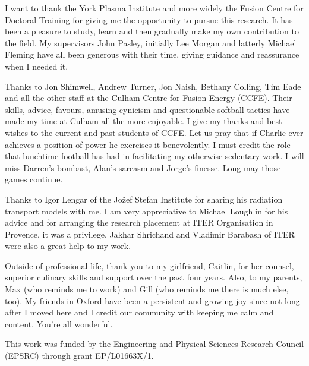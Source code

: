 
\begin{acknowledgements}      
I want to thank the York Plasma Institute and more widely the Fusion Centre for Doctoral Training for giving me the opportunity to pursue this research. It has been a pleasure to study, learn and then gradually make my own contribution to the field. My supervisors John Pasley, initially Lee Morgan and latterly Michael Fleming have all been generous with their time, giving guidance and reassurance when I needed it. 

Thanks to Jon Shimwell, Andrew Turner, Jon Naish, Bethany Colling, Tim Eade and all the other staff at the Culham Centre for Fusion Energy (CCFE). Their skills, advice, favours, amusing cynicism and questionable softball tactics have made my time at Culham all the more enjoyable. I give my thanks and best wishes to the current and past students of CCFE. Let us pray that if Charlie ever achieves a position of power he exercises it benevolently. I must credit the role that lunchtime football has had in facilitating my otherwise sedentary work. I will miss Darren's bombast, Alan's sarcasm and Jorge's finesse. Long may those games continue. 

Thanks to Igor Lengar of the Jo\v zef Stefan Institute for sharing his radiation transport models with me. I am very appreciative to Michael Loughlin for his advice and for arranging the research placement at ITER Organisation in Provence, it was a privilege. Jakhar Shrichand and Vladimir Barabash of ITER were also a great help to my work.

Outside of professional life, thank you to my girlfriend, Caitlin, for her counsel, superior culinary skills and support over the past four years. Also, to my parents, Max (who reminds me to work) and Gill (who reminds me there is much else, too). My friends in Oxford have been a persistent and growing joy since not long after I moved here and I credit our community with keeping me calm and content. You're all wonderful.

This work was funded by the Engineering and Physical Sciences Research Council (EPSRC) through grant EP/L01663X/1.
\end{acknowledgements}
